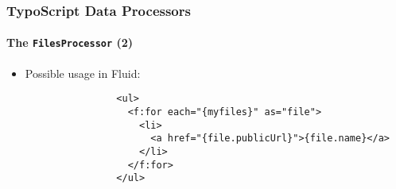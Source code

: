 \begin{frame}[fragile]
	\frametitle{TypoScript Data Processors}
	\framesubtitle{The \texttt{FilesProcessor} (2)}

	\lstset{basicstyle=\tiny\ttfamily}

	\begin{itemize}

		\item Possible usage in Fluid:

			\begin{lstlisting}
				<ul>
				  <f:for each="{myfiles}" as="file">
				    <li>
				      <a href="{file.publicUrl}">{file.name}</a>
				    </li>
				  </f:for>
				</ul>
			\end{lstlisting}

	\end{itemize}

\end{frame}


